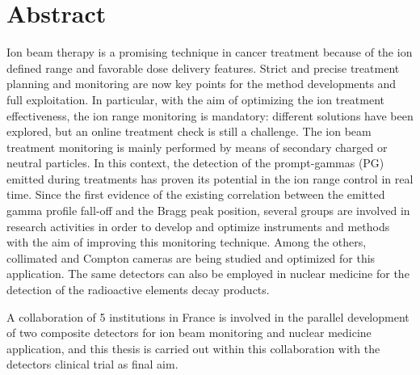 \chapter*{Abstract}


Ion beam therapy is a promising technique in cancer treatment because of the ion defined range and favorable dose delivery features. Strict and precise treatment planning and monitoring are now key points for the method developments and full exploitation. In particular, with the aim of optimizing the ion treatment effectiveness, the ion range monitoring is mandatory: different solutions have been explored, but an online treatment check is still a challenge. 
The ion beam treatment monitoring is mainly performed by means of secondary charged or neutral particles. In this context, the detection of the prompt-gammas (PG) emitted during treatments has proven its potential in the ion range control in real time. Since the first evidence of the existing correlation between the emitted gamma profile fall-off and the Bragg peak position, several groups are involved in research activities in order to develop and optimize instruments and methods with the aim of improving this monitoring technique.  Among the others, collimated and Compton cameras are being studied and optimized for this application. The same detectors can also be employed in nuclear medicine for the detection of the radioactive elements decay products.      



A collaboration of 5 institutions in France is involved in the parallel development of two composite detectors for ion beam monitoring and nuclear medicine application, and this thesis is carried out within this collaboration with the detectors clinical trial as final aim.



